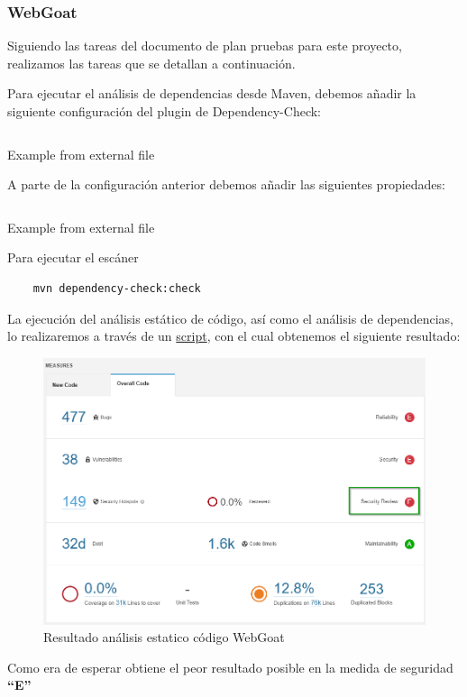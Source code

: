 \subsubsection{WebGoat}
Siguiendo las tareas del documento de plan pruebas para este proyecto, realizamos las tareas que se detallan a continuación.

Para ejecutar el análisis de dependencias desde Maven, debemos añadir la siguiente configuración del plugin de Dependency-Check:

\begin{listing}[ht]
    \inputminted{xml}{./Ficheros/ConfiguracionPlugin_Maven.xml}
    \caption{Example from external file}
    \label{listing:4}
\end{listing}
A parte de la configuración anterior debemos añadir las siguientes propiedades:
\begin{listing}[ht]
    \inputminted{xml}{./Ficheros/ConfigPropertiesPlugin_maven.xml}
    \caption{Example from external file}
    \label{listing:4}
\end{listing}
Para ejecutar el escáner
\begin{verbatim}
    mvn dependency-check:check
\end{verbatim}

La ejecución del análisis estático de código, así como el análisis de dependencias, lo realizaremos a través de un 
\href{https://github.com/M0l1n3ta/PFG/blob/master/Scripts/STAT/RunSonarScaner_WebGoat.ps1}{script}, con el cual
obtenemos el siguiente resultado:
\begin{figure}[h!]  
    \includegraphics[width=\linewidth]{./imagenes/09_AnalisisEstatico_WebGoat.png}
    \caption{Resultado análisis estatico código WebGoat}  
    \label{fig:9}
\end{figure}
Como era de esperar obtiene el peor resultado posible en la medida de seguridad \textbf{“E”}

